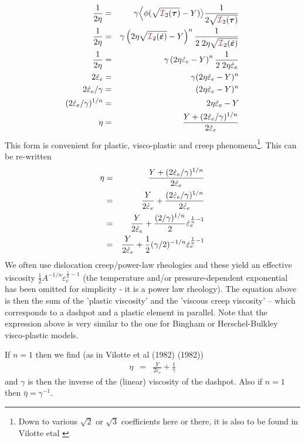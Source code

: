 \begin{eqnarray}
\frac{1}{2\eta} 
&=& \gamma \Big\langle \phi(\sqrt{{\III}_2(\bm \tau)}- Y)  \big\rangle 
\frac{1}{2 \sqrt{{\III}_2(\bm \tau)}} \nn\\
\frac{1}{2\eta} 
&=& \gamma \left(2\eta \sqrt{{\III}_2(\dot{\bm\varepsilon})}- Y\right)^n  \frac{1}{2 \; 2 \eta \sqrt{{\III}_2(\dot{\bm\varepsilon})}} \nn\\
\frac{1}{2\eta} 
&=& \gamma \left(2\eta \dot\varepsilon_e - Y\right)^n  \frac{1}{2 \; 2 \eta \dot\varepsilon_e } \nn\\
2 \dot\varepsilon_e
&=& \gamma (2\eta \dot\varepsilon_e - Y)^n  \nn\\
2 \dot\varepsilon_e / \gamma
&=&  (2\eta \dot\varepsilon_e - Y)^n  \nn\\
(2 \dot\varepsilon_e / \gamma)^{1/n}
&=&  2\eta \dot\varepsilon_e - Y \nn\\
\eta &=& \frac{ Y + (2 \dot\varepsilon_e / \gamma)^{1/n}}{2  \dot\varepsilon_e}
\end{eqnarray}
This form is convenient for plastic, visco-plastic and creep phenomena\footnote{Down 
to various $\sqrt{2}$ or $\sqrt{3}$ coefficients here or there, it 
is also to be found in Vilotte etal \cite{vidm82,vidm84,vimd86}}.
This can be re-written
\begin{eqnarray}
\eta 
&=& \frac{ Y + (2 \dot\varepsilon_e / \gamma)^{1/n}}{2  \dot\varepsilon_e} \nonumber\\
&=& \frac{ Y }{2  \dot\varepsilon_e}
+ \frac{ (2 \dot\varepsilon_e / \gamma)^{1/n}}{2  \dot\varepsilon_e} \nonumber\\
&=& \frac{ Y }{2  \dot\varepsilon_e}
+ \frac{ (2  / \gamma)^{1/n}}{2 }   \dot\varepsilon_e^{\frac1n-1} \nonumber\\
&=& \frac{ Y }{2  \dot\varepsilon_e}
+ \frac{1 }{2 } (\gamma/2)^{-1/n}  \dot\varepsilon_e^{\frac1n-1} 
\label{eq:zien75:a}
\end{eqnarray}
We often use dislocation creep/power-law rheologies and these yield an effective 
viscosity $\frac12 A^{-1/n} \dot\varepsilon_e^{\frac1n-1}$ (the temperature and/or 
pressure-dependent exponential has been omitted for simplicity - it is a power law rheology).
The equation above is then the sum of the 'plastic viscosity' and the 'viscous creep viscosity' 
-- which corresponds to a dashpot and a plastic element in parallel.
Note that the expression above is very similar to the one for Bingham or Herschel-Bulkley visco-plastic
models.

If $n=1$ then we find (as in Vilotte et al (1982) \cite{vidm82} (1982))
\begin{eqnarray}
\eta 
&=& \frac{ Y }{2  \dot\varepsilon_e}
+ \frac{1 }{\gamma } 
\end{eqnarray}
and $\gamma$ is then the inverse of the (linear) viscosity of the dashpot.
Also if $n=1$ then $\bar\eta=\gamma^{-1}$.

